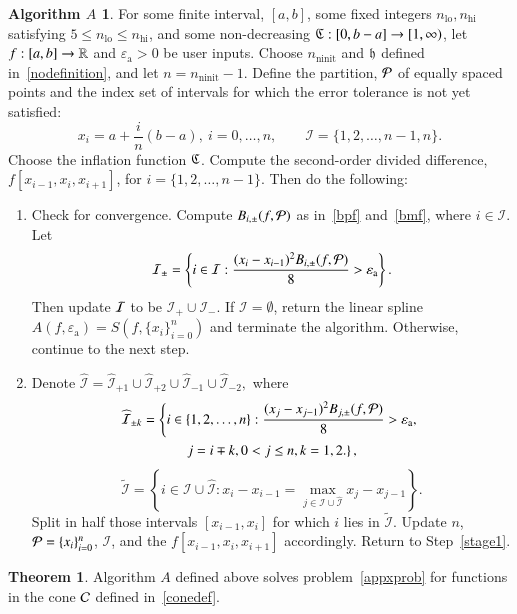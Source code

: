 \documentclass[review]{elsarticle}
\newcommand{\abstol}{\varepsilon_{\textrm{a}}}
\theoremstyle{definition}
\newtheorem*{algoA}{Algorithm $A$}
\DeclareMathOperator{\lo}{lo}
\DeclareMathOperator{\ninit}{ninit}
\newtheorem{theorem}{Theorem}
\begin{document}
\begin{algoA} \label{AlgoA}
For some finite interval, $[a,b]$, some fixed integers $n_{\lo}, n_{\text{hi}}$ satisfying $5 \le n_{\lo} \le n_{\text{hi}}$, and some non-decreasing
$\mathfrak{C}:[0,b-a] \to [1, \infty)$, let $f:[a,b] \to \mathbb{R}$ and $\abstol >0$ be
user inputs. Choose $n_{\ninit}$ and $\mathfrak{h}$ defined in~\eqref{nodefinition}, and let  $n=n_{\ninit}-1$.
Define the partition, $\mathcal{P}$ of  equally spaced points and the index set of intervals for which the error tolerance
is not yet satisfied:
$$x_i=a+\frac{i}{n}(b-a), \ i=0,\ldots,n, \qquad
\mathcal{I} = \{1,2,\ldots,n-1,n\}.$$
Choose the inflation function $\mathfrak{C}$. Compute the second-order divided difference, $f[x_{i-1},
x_{i}, x_{i+1}]$, for $i = \{1,2,\ldots,n-1\}$. Then do the
following:
\begin{enumerate}[\bf Step 1.]%
\item \label{stage1} Check for convergence.
Compute $B_{i,\pm}(f,\mathcal{P})$ as in~\eqref{bpf} and~\eqref{bmf}, where $i \in \mathcal{I}$.
Let
\[
\mathcal{I}_\pm = \left\{i \in \mathcal{I}: \frac{(x_i - x_{i-1})^2B_{i,\pm}(f,\cp)}{8}  > \abstol \right\}.
\]
Then update $\mathcal{I}$ to be $\mathcal{I}_+ \cup \mathcal{I}_-$.  If $\mathcal{I} = \emptyset$, return the linear spline $A(f,\abstol) = S(f, \{x_i\}_{i=0}^n)$ and terminate the algorithm.
Otherwise, continue to the next step.
\item \label{stage2}
Denote $\widehat{\mathcal{I}}=\widehat{\mathcal{I}}_{+1} \cup \widehat{\mathcal{I}}_{+2} \cup \widehat{\mathcal{I}}_{-1} \cup \widehat{\mathcal{I}}_{-2},$ where
\begin{multline*}
\widehat{\mathcal{I}}_{\pm k} = \left\{i \in \{1,2,\ldots,n\}: \frac{(x_j - x_{j-1})^2B_{j,\pm}(f,\cp)}{8}  > \abstol,\right.\\
 \left.j=i\mp k, 0<j\le n, k=1,2. \right\},
\end{multline*}
\[\widetilde{\mathcal{I}}=\left\{i \in \mathcal{I} \cup \widehat{\mathcal{I}}: x_i - x_{i-1}=\max\limits_{j \in \mathcal{I} \cup \widehat{\mathcal{I}} } x_j-x_{j-1} \right\}.\]
Split in half those intervals $[x_{i-1},x_i]$ for which $i$ lies in $\widetilde{\mathcal{I}}$.
Update $n$, $\mathcal{P} = \{x_i\}_{i=0}^n$, $\mathcal{I}$, and the $f[x_{i-1}, x_{i}, x_{i+1}]$ accordingly.  Return to Step~\ref{stage1}.
\end{enumerate}
\end{algoA}

\begin{theorem} \label{thm:algAworks}
Algorithm $A$ defined above solves problem~\eqref{appxprob} for functions in the cone $\mathcal{C}$ defined in~\eqref{conedef}.
\end{theorem}
\end{document}

